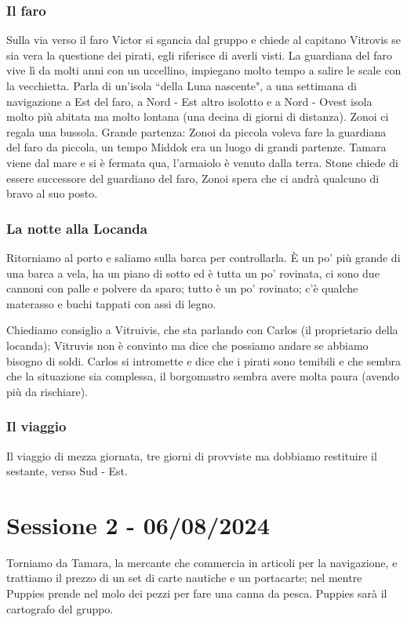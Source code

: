 \documentclass[letterpaper,twocolumn,openany,justified,nodeprecatedcode]{dndbook}
\begin{document}
\subsection{Il faro} Sulla via verso il faro Victor si sgancia dal gruppo e chiede al capitano Vitrovis se sia vera la questione dei pirati, egli riferisce di averli visti. La guardiana del faro vive lì da molti anni con un uccellino, impiegano molto tempo a salire le scale con la vecchietta. Parla di un'isola ``della Luna nascente", a una settimana di navigazione a Est del faro, a Nord - Est altro isolotto e a Nord - Ovest isola molto più abitata ma molto lontana (una decina di giorni di distanza). Zonoi ci regala una bussola. Grande partenza: Zonoi da piccola voleva fare la guardiana del faro da piccola, un tempo Middok era un luogo di grandi partenze. Tamara viene dal mare e si è fermata qua, l'armaiolo è venuto dalla terra. Stone chiede di essere successore del guardiano del faro, Zonoi spera che ci andrà qualcuno di bravo al suo posto.

\subsection{La notte alla Locanda}
Ritorniamo al porto e saliamo sulla barca per controllarla. È un po' più grande di una barca a vela, ha un piano di sotto ed è tutta un po' rovinata, ci sono due cannoni con palle e polvere da sparo; tutto è un po' rovinato; c'è qualche materasso e buchi tappati con assi di legno.

Chiediamo consiglio a Vitruivis, che sta parlando con Carlos (il proprietario della locanda); Vitruvis non è convinto ma dice che possiamo andare se abbiamo bisogno di soldi. Carlos si intromette e dice che i pirati sono temibili e che sembra che la situazione sia complessa, il borgomastro sembra avere molta paura (avendo più da rischiare).

\subsection{Il viaggio}
Il viaggio di mezza giornata, tre giorni di provviste ma dobbiamo restituire il sestante, verso Sud - Est.

\chapter*{Sessione 2 - 06/08/2024}
Torniamo da Tamara, la mercante che commercia in articoli per la navigazione, e trattiamo il prezzo di un set di carte nautiche e un portacarte; nel mentre Puppies prende nel molo dei pezzi per fare una canna da pesca. Puppies sarà il cartografo del gruppo.
\end{document}
